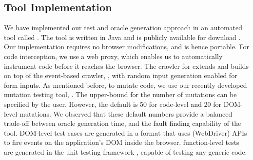 \subsection{Tool Implementation} \label{Sec:tool}
We have implemented our \javascript test and oracle generation approach in an automated tool called \tool. The tool is written in Java and is publicly available for download \cite{jseft-dl}. Our implementation requires no browser modifications, and is hence portable. For \javascript code interception, we use a web proxy, which enables us to automatically instrument \javascript code before it reaches the browser. 
The crawler for \tool extends and builds on top of the  event-based crawler, \crawljax \cite{mesbah:tweb11}, with random input generation enabled for  form inputs.
%
As mentioned before, to mutate \javascript code, we use our recently developed mutation testing tool, \mutandis \cite{mirshokraie:icst13}. The upper-bound for the number of mutations can be specified by the 
user. However, the default is 50 for code-level and 20 for DOM-level mutations. We observed that these default numbers  provide a balanced trade-off between oracle generation time, and the fault finding capability of the tool. %
%
DOM-level test cases are generated in a \junit format that uses \selenium (WebDriver) APIs to fire events on the application's DOM inside the browser. \javascript function-level tests are generated in the \qunit unit testing framework \cite{quint}, capable of testing any generic \javascript code. 

